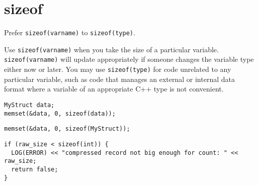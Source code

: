 
\section{sizeof}\label{sec:sizeof}
Prefer \texttt{sizeof(varname)} to \texttt{sizeof(type)}.

Use \texttt{sizeof(varname)} when you take the size of a particular variable. \texttt{sizeof(varname)} will update appropriately if someone changes the variable type either now or later. You may use \texttt{sizeof(type)} for code unrelated to any particular variable, such as code that manages an external or internal data format where a variable of an appropriate C++ type is not convenient.
\begin{verbatim}
MyStruct data;
memset(&data, 0, sizeof(data));
\end{verbatim}
\begin{verbatim}
memset(&data, 0, sizeof(MyStruct));
\end{verbatim}
\begin{verbatim}
if (raw_size < sizeof(int)) {
  LOG(ERROR) << "compressed record not big enough for count: " << raw_size;
  return false;
}
\end{verbatim}
